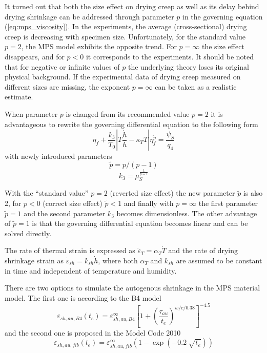 \documentclass[a4paper]{article}
\begin{document}
It turned out that both the size effect on drying creep as well as its delay behind drying shrinkage can be addressed through parameter $p$ in the governing equation (\ref{eq:mps_viscosity}). In the experiments, the average (cross-sectional) drying creep is decreasing with specimen size. Unfortunately, for the standard value $p=2$, the MPS model exhibits the opposite trend. For $p = \infty$ the size effect disappears, and for $p < 0$ it corresponds to the experiments. It should be noted that for negative or infinite values of $p$ the underlying theory loses its original physical background. 
If the experimental data of drying creep measured on different sizes
are missing, the exponent $p = \infty$ can be taken as a realistic
estimate.  

When parameter $p$ is changed from its recommended value $p = 2$ it is advantageous to rewrite the governing differential equation to the following form
%
\begin{equation}
{\dot \eta_f + \frac{k_3}{T_0} \left| T \frac{\dot h}{h}  - \kappa_T  \dot T \right|  \eta_f^{\tilde{p}} = \frac{\psi_S}{q_4}}
\label{eq:mps_reformulate}
\end{equation}
%
with newly introduced parameters
%
\begin{equation}
\label{eq:mps_p}
\tilde{p} = p / (p-1)
\end{equation}
%
\begin{equation}
\label{eq:mps_k3}
k_3 = \mu_S^{\frac{1}{p-1}}
\end{equation}

With the ``standard value'' $p = 2$ (reverted size effect) the new
parameter $\tilde{p}$ is also 2, for $p < 0$ (correct size effect)
$\tilde{p} < 1$ and finally with $p = \infty$ the first parameter
$\tilde{p} = 1$ and the second parameter $k_3$ becomes
dimensionless. The other advantage of $\tilde{p} = 1$ is that the
governing differential equation becomes linear and can be solved
directly. 


The rate of thermal strain is expressed as $\dot{\varepsilon}_T = \alpha_T \dot{T}$ and the rate of drying shrinkage strain as $\dot{\varepsilon}_{sh} = k_{sh} \dot{h}$, where both $\alpha_T$ and $k_{sh}$ are assumed to be constant in time and independent of temperature and humidity. 

There are two options to simulate the autogenous shrinkage in the MPS material model. The first one is according to the B4 model 
\begin{equation}
\varepsilon_{sh,au,B4}(t_e) = \varepsilon_{sh,au,B4}^\infty \left[ 1 + \left( \frac{ \tau_{au} }{t_e} \right) ^ {w/c/0.38} \right]^{-4.5}
\label{eq:auto_shr_b4}
\end{equation}
and the second one is proposed in the Model Code 2010
\begin{equation}
\varepsilon_{sh,au,fib}(t_e) = \varepsilon_{sh,au,fib}^\infty \left( 1- \exp \left( -0.2 \: \sqrt{t_e} \right) \right)
\label{eq:auto_shr_fib}
\end{equation}
\end{document}
